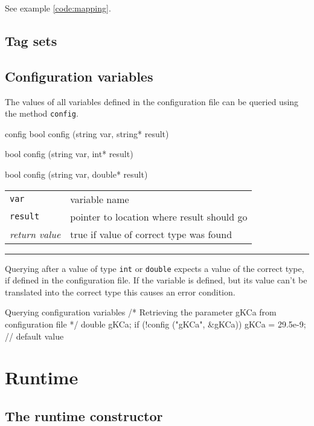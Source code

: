 \documentclass[a4paper]{report}
\makeatletter
\newenvironment{parameters}%
{\begin{tabular}{@{\hspace{2em}}lp{0.6\textwidth}}}%
{\end{tabular}\par\vspace{1mm}\par\hrule\par\vspace{5mm}}
\makeatother
\begin{document}
See example \ref{code:mapping}.


\subsection{Tag sets}
\label{sec:tagset}



\subsection{Configuration variables}

The values of all variables defined in the configuration file can be
queried using the method \lstinline|config|.

\begin{head}{config}
  bool config (string var, string* result)

  bool config (string var, int* result)

  bool config (string var, double* result)
\end{head}
\begin{parameters}
  \lstinline|var|     & variable name \\
  \lstinline|result|  & pointer to location where result should go \\
  \emph{return value} & true if value of correct type was found \\
\end{parameters}

Querying after a value of type \lstinline|int| or \lstinline|double|
expects a value of the correct type, if defined in the configuration
file.  If the variable is defined, but its value can't be translated
into the correct type this causes an error condition.

\begin{code}{Querying configuration variables}
/* Retrieving the parameter gKCa
   from configuration file */
double gKCa;
if (!config ("gKCa", &gKCa))
  gKCa = 29.5e-9; // default value
\end{code}

\section{Runtime}

\subsection{The runtime constructor}
\end{document}
